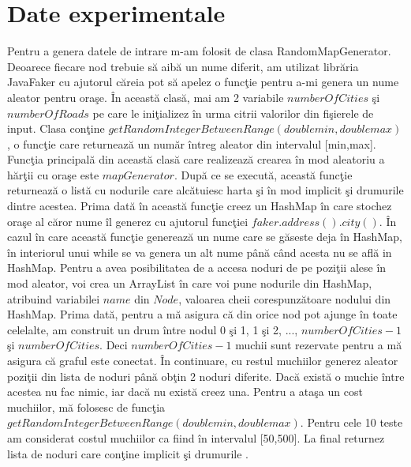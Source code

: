 \documentclass{article}
\begin{document}
 \section{Date experimentale}

Pentru a genera datele de intrare m-am folosit de clasa RandomMapGenerator. Deoarece fiecare nod trebuie s\u{a} aib\u{a} un nume diferit, am utilizat libr\u{a}ria JavaFaker cu ajutorul c\u{a}reia pot s\u{a} apelez o func\c{t}ie pentru a-mi genera un nume aleator pentru ora\c{s}e. \^{I}n aceast\u{a} clas\u{a}, mai am 2 variabile $numberOfCities$ \c{s}i $numberOfRoads$ pe care le ini\c{t}ializez \^{i}n urma citrii valorilor din fi\c{s}ierele de input. Clasa con\c{t}ine $getRandomIntegerBetweenRange(double min, double max)$, o func\c{t}ie care returneaz\u{a} un num\u{a}r \^{i}ntreg aleator din intervalul [min,max]. Func\c{t}ia principal\u{a} din aceast\u{a} clas\u{a} care realizeaz\u{a} crearea \^{i}n mod aleatoriu a h\u{a}r\c{t}ii cu ora\c{s}e este $mapGenerator$. Dup\u{a} ce se execut\u{a}, aceast\u{a} func\c{t}ie returneaz\u{a} o list\u{a} cu nodurile care alc\u{a}tuiesc harta \c{s}i \^{i}n mod implicit \c{s}i drumurile dintre acestea. Prima dat\u{a} \^{i}n aceast\u{a} func\c{t}ie creez un HashMap \^{i}n care stochez ora\c{s}e al c\u{a}ror nume \^{i}l generez cu ajutorul func\c{t}iei $faker.address().city()$. \^{I}n cazul \^{i}n care aceast\u{a} func\c{t}ie genereaz\u{a} un nume care se g\u{a}seste deja \^{i}n HashMap, \^{i}n interiorul unui while se va genera un alt nume p\^{a}n\u{a} c\^{a}nd acesta nu se afl\u{a} in HashMap. Pentru a avea posibilitatea de a accesa noduri de pe pozi\c{t}ii alese \^{i}n mod aleator, voi crea un ArrayList \^{i}n care voi pune nodurile din HashMap, atribuind variabilei $name$ din $Node$, valoarea cheii corespunz\u{a}toare nodului din HashMap. Prima dat\u{a}, pentru a m\u{a} asigura c\u{a} din orice nod pot ajunge \^{i}n toate celelalte, am construit un drum \^{i}ntre nodul 0 \c{s}i 1, 1 \c{s}i 2, ..., $numberOfCities-1$ \c{s}i $numberOfCities$. Deci $numberOfCities-1$ muchii sunt rezervate pentru a m\u{a} asigura c\u{a} graful este conectat. \^{I}n continuare, cu restul muchiilor generez aleator pozi\c{t}ii din lista de noduri p\^{a}n\u{a} ob\c{t}in 2 noduri diferite. Dac\u{a} exist\u{a} o muchie \^{i}ntre acestea nu fac nimic, iar dac\u{a} nu exist\u{a} creez una. Pentru a ata\c{s}a un cost muchiilor, m\u{a} folosesc de func\c{t}ia $getRandomIntegerBetweenRange(double min, double max)$. Pentru cele 10 teste am considerat costul muchiilor ca fiind \^{i}n intervalul [50,500]. La final returnez lista de noduri care con\c{t}ine implicit \c{s}i drumurile .
\end{document}
